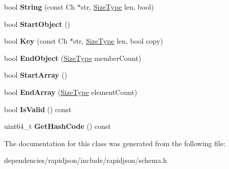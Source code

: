 \begin{DoxyCompactItemize}
bool {\bfseries String} (const Ch $\ast$str, \hyperlink{rapidjson_8h_a5ed6e6e67250fadbd041127e6386dcb5}{Size\+Type} len, bool)
\item 
\mbox{\label{classinternal_1_1_hasher_a1607d6cac3daab9725e442e38d121028}} 
bool {\bfseries Start\+Object} ()
\item 
\mbox{\label{classinternal_1_1_hasher_a1b34d88f85f9c6a739c1f9038f14f078}} 
bool {\bfseries Key} (const Ch $\ast$str, \hyperlink{rapidjson_8h_a5ed6e6e67250fadbd041127e6386dcb5}{Size\+Type} len, bool copy)
\item 
\mbox{\label{classinternal_1_1_hasher_a7050f1552d88967944195163a6a0b08e}} 
bool {\bfseries End\+Object} (\hyperlink{rapidjson_8h_a5ed6e6e67250fadbd041127e6386dcb5}{Size\+Type} member\+Count)
\item 
\mbox{\label{classinternal_1_1_hasher_a2ceb3cc00216f6b6ce66907856a16404}} 
bool {\bfseries Start\+Array} ()
\item 
\mbox{\label{classinternal_1_1_hasher_ad445b2730be23e18b4dec2c4d1033419}} 
bool {\bfseries End\+Array} (\hyperlink{rapidjson_8h_a5ed6e6e67250fadbd041127e6386dcb5}{Size\+Type} element\+Count)
\item 
\mbox{\label{classinternal_1_1_hasher_ae09fee05c56194031e8af94a1b1be145}} 
bool {\bfseries Is\+Valid} () const
\item 
\mbox{\label{classinternal_1_1_hasher_ac221aaaa0d643aae553125e76aed7b47}} 
uint64\+\_\+t {\bfseries Get\+Hash\+Code} () const
\end{DoxyCompactItemize}


The documentation for this class was generated from the following file\+:\begin{DoxyCompactItemize}
\item 
dependencies/rapidjson/include/rapidjson/schema.\+h\end{DoxyCompactItemize}
